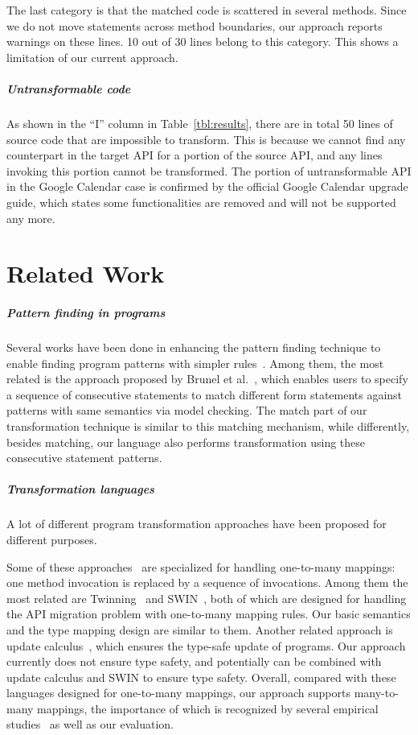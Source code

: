 \documentclass[a4paper, USenglish]{lipics-v2016}
\theoremstyle{plain}
\begin{document}
The last category is that the
matched code is scattered in several methods. Since we do not
move statements across method boundaries, our approach reports
warnings on these lines. 10 out of 30 lines
belong to this category. This shows a limitation of our current
approach.

\subparagraph*{Untransformable code}
As shown in the ``I'' column in
Table~\ref{tbl:results}, there are in total 50 lines of source code
that are impossible to transform. This is because we cannot find any
counterpart in the target API for a portion of the source API, and any
lines invoking this portion cannot be transformed. The portion of
untransformable API in the Google Calendar case is confirmed by the
official Google Calendar upgrade guide, which states some
functionalities are removed and will not be supported any more. 



\section{Related Work}
\label{sec:related}
\subparagraph*{Pattern finding in programs} Several works have been
done in enhancing the pattern finding technique to enable finding
program patterns with simpler
rules~\cite{SANER-2015-PalixFL,DBLP:conf/popl/BrunelDHLM09}.
Among them, the most related is the approach proposed by
Brunel et al.~\cite{DBLP:conf/popl/BrunelDHLM09}, which enables users to
specify a sequence of consecutive statements to match different form
statements against patterns with same semantics via model
checking. The match part of our transformation technique is similar to
this matching mechanism, while differently, besides matching, our language also performs transformation using these consecutive statement patterns.
\subparagraph*{Transformation languages} A lot of different program
transformation approaches have been proposed for different purposes.

Some of these approaches~\cite{Nita:2010:UTA:1806799.1806832,Li:2015:STT:2678015.2682534,Balaban:2005:RSC:1094811.1094832,Wasserman:2013:SER:2541348.2541355,53e99905b7602d9702142000,53e99aecb7602d9702376989} are specialized for handling one-to-many mappings: one method invocation is replaced by a sequence of invocations. 
Among them the most related are
Twinning~\cite{Nita:2010:UTA:1806799.1806832} and
SWIN~\cite{Li:2015:STT:2678015.2682534}, both of which are designed
for handling the API migration problem with one-to-many mapping rules. Our basic
semantics and the type mapping design are similar to them. Another related approach is update
calculus~\cite{53e99905b7602d9702142000,53e99aecb7602d9702376989},
which ensures the type-safe update of programs. Our approach
currently does not ensure type safety, and potentially can be combined
with update calculus and SWIN to ensure type safety.
Overall, compared with these languages designed for one-to-many mappings, our approach supports many-to-many mappings, the importance of which is recognized by several empirical studies~\cite{Bartolomei:2009:SAM:2127907.2127914,246} as well as our evaluation.
\end{document}
